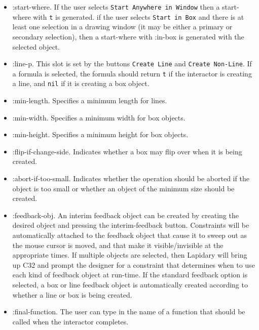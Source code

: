 \begin{itemize}
\item :start-where. If the user selects {\tt Start Anywhere in Window} then a
start-where with {\tt t} is generated. if the user selects
{\tt Start in Box} and there is at least one selection in a drawing
window (it may be either a primary or secondary selection), then a start-where
with :in-box is generated with the selected object.

\item :line-p. This slot is set by the buttons {\tt Create Line} and
{\tt Create Non-Line}. If a formula is selected, the formula should return
{\tt t} if
the interactor is creating a line, and {\tt nil} if it is creating
a box object.

\item :min-length. Specifies a minimum length for lines.

\item :min-width. Specifies a minimum width for box objects.

\item :min-height. Specifies a minimum height for box objects.

\item :flip-if-change-side. Indicates whether a box may flip over when it is
being created.

\item :abort-if-too-small. Indicates whether the operation should be aborted
if the object is too small or whether an object of the minimum size
should be created.

\item :feedback-obj. An interim feedback object
can be created by creating the desired object and pressing the
interim-feedback button.  Constraints will be automatically attached to
the feedback object that cause it to sweep out as the mouse cursor
is moved, and that make it visible/invisible at the appropriate times.
If multiple objects are selected, then
Lapidary will bring up C32
and prompt the designer for a constraint that determines when to use each
kind of feedback object at run-time.
If the standard feedback option is selected, a box or line feedback object
is automatically created according to whether a line or box is being created.

\item :final-function. The user can type in the name of a function that should
be called when the interactor completes.

\end{itemize}

